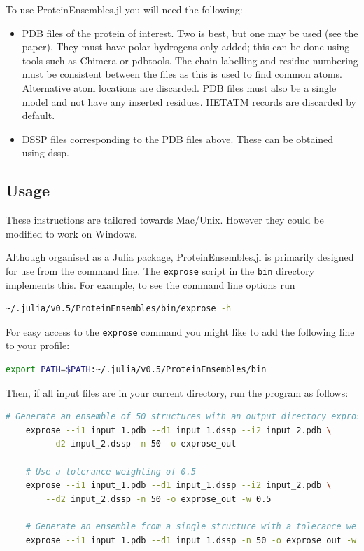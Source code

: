 To use ProteinEnsembles.jl you will need the following:
\begin{itemize}
\item PDB files of the protein of interest. Two is best, but one may be used (see the paper). They must have polar hydrogens only added; this can be done using tools such as Chimera or pdbtools. The chain labelling and residue numbering must be consistent between the files as this is used to find common atoms. Alternative atom locations are discarded. PDB files must also be a single model and not have any inserted residues. HETATM records are discarded by default.
\item DSSP files corresponding to the PDB files above. These can be obtained using dssp.
\end{itemize}


\subsection*{Usage}

These instructions are tailored towards Mac/Unix. However they could be modified to work on Windows.

Although organised as a Julia package, ProteinEnsembles.jl is primarily designed for use from the command line. The \verb|exprose| script in the \verb|bin| directory implements this. For example, to see the command line options run

\begin{lstlisting}[language=bash]
    ~/.julia/v0.5/ProteinEnsembles/bin/exprose -h
\end{lstlisting}

For easy access to the \verb|exprose| command you might like to add the following line to your profile:

\begin{lstlisting}[language=bash]
    export PATH=$PATH:~/.julia/v0.5/ProteinEnsembles/bin
\end{lstlisting}

Then, if all input files are in your current directory, run the program as follows:

\begin{lstlisting}[language=bash]
    # Generate an ensemble of 50 structures with an output directory exprose_out
    exprose --i1 input_1.pdb --d1 input_1.dssp --i2 input_2.pdb \
        --d2 input_2.dssp -n 50 -o exprose_out

    # Use a tolerance weighting of 0.5
    exprose --i1 input_1.pdb --d1 input_1.dssp --i2 input_2.pdb \
        --d2 input_2.dssp -n 50 -o exprose_out -w 0.5

    # Generate an ensemble from a single structure with a tolerance weighting of 1.0
    exprose --i1 input_1.pdb --d1 input_1.dssp -n 50 -o exprose_out -w 1.0
\end{lstlisting}

